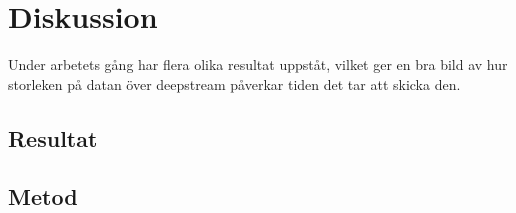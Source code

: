 \section{Diskussion}
\label{sec:tim-discussion}
Under arbetets gång har flera olika resultat uppståt, vilket ger en bra bild av hur storleken på datan över deepstream påverkar tiden det tar att skicka den. 

\subsection{Resultat}
\label{subsec:tim-discussion-results}

\subsection{Metod}
\label{subsec:tim-discussion-method}


